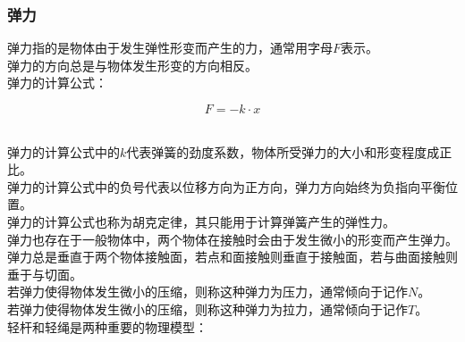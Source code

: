 \documentclass[UTF8]{ctexart}
\begin{document}
\subsubsection{弹力}
    弹力指的是物体由于发生弹性形变而产生的力，通常用字母$F$表示。\\[3mm]
    弹力的方向总是与物体发生形变的方向相反。\\[3mm]
    弹力的计算公式：
    \begin{large}
        \begin{equation*}
            F=-k\cdot x
        \end{equation*}
    \end{large}\\
    弹力的计算公式中的$k$代表弹簧的劲度系数，物体所受弹力的大小和形变程度成正比。\\[3mm]
    弹力的计算公式中的负号代表以位移方向为正方向，弹力方向始终为负指向平衡位置。\\[6mm]
    弹力的计算公式也称为胡克定律，其只能用于计算弹簧产生的弹性力。\\[3mm]
    弹力也存在于一般物体中，两个物体在接触时会由于发生微小的形变而产生弹力。\\[3mm]
    弹力总是垂直于两个物体接触面，若点和面接触则垂直于接触面，若与曲面接触则垂于与切面。\\[3mm]
    若弹力使得物体发生微小的压缩，则称这种弹力为压力，通常倾向于记作$N$。\\[3mm]
    若弹力使得物体发生微小的压缩，则称这种弹力为拉力，通常倾向于记作$T$。\\[6mm]
    轻杆和轻绳是两种重要的物理模型：
\end{document}
